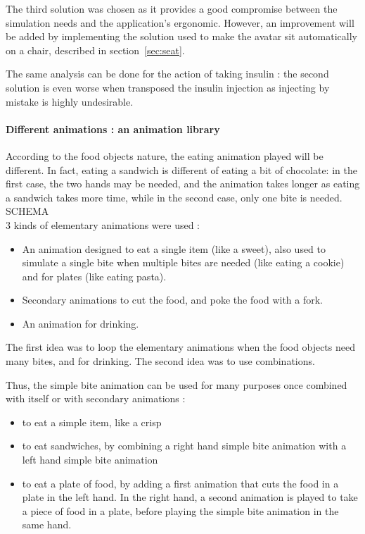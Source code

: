 The third solution was chosen as it provides a good compromise between the simulation needs and the application's ergonomic. However, an improvement will be added by implementing the solution used to make the avatar sit automatically on a chair, described in section~\ref{sec:seat}.

The same analysis can be done for the action of taking insulin : the second solution is even worse when transposed the insulin injection as injecting by mistake is highly undesirable.

	\paragraph{Different animations : an animation library}
\label{sec:animLib}

According to the food objects nature, the eating animation played will be different. In fact, eating a sandwich is different of eating a bit of chocolate: in the first case, the two hands may be needed, and the animation takes longer as eating a sandwich takes more time, while in the second case, only one bite is needed.\\
SCHEMA\\

3 kinds of elementary animations were used : 
\begin{itemize}
\item An animation designed to eat a single item (like a sweet), also used to simulate a single bite when multiple bites are needed (like eating a cookie) and for plates (like eating pasta).
\item Secondary animations to cut the food, and poke the food with a fork.
\item An animation for drinking.
\end{itemize}
The first idea was to loop the elementary animations when the food objects need many bites, and for drinking. The second idea was to use combinations. 

Thus, the simple bite animation can be used for many purposes once combined with itself or with secondary animations :
\begin{itemize}
\item to eat a simple item, like a crisp
\item to eat sandwiches, by combining a right hand simple bite animation with a left hand simple bite animation
\item to eat a plate of food, by adding a first animation that cuts the food in a plate in the left hand. In the right hand, a second animation is played to take a piece of food in a plate, before playing the simple bite animation in the same hand.
\end{itemize}

